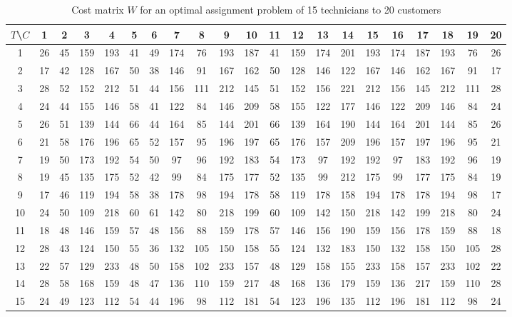 \begin{enumerate}[(a)]
\begin{enumerate}[1.]
\begin{table}[H]
	\centering
	\caption{Cost matrix $W$ for an optimal assignment problem of 15 technicians to 20 customers}
	\begin{tabular}{|*{21}{c|}}\hline
 $T$\textbackslash $C$ & 1 & 2 & 3 & 4 & 5 & 6 & 7 & 8 & 9 & 10 & 11 & 12 & 13 & 14 & 15 & 16 & 17 & 18 & 19 & 20\\\hline
1 & 26  & 45  & 159  & 193  & 41  & 49  & 174  & 76  & 193  & 187  & 41  & 159  & 174  & 201  & 193  & 174  & 187  & 193  & 76  & 26 \\ \hline
2 & 17  & 42  & 128  & 167  & 50  & 38  & 146  & 91  & 167  & 162  & 50  & 128  & 146  & 122  & 167  & 146  & 162  & 167  & 91  & 17 \\ \hline
3 & 28  & 52  & 152  & 212  & 51  & 44  & 156  & 111  & 212  & 145  & 51  & 152  & 156  & 221  & 212  & 156  & 145  & 212  & 111  & 28 \\ \hline
4 & 24  & 44  & 155  & 146  & 58  & 41  & 122  & 84  & 146  & 209  & 58  & 155  & 122  & 177  & 146  & 122  & 209  & 146  & 84  & 24 \\ \hline
5 & 26  & 51  & 139  & 144  & 66  & 44  & 164  & 85  & 144  & 201  & 66  & 139  & 164  & 190  & 144  & 164  & 201  & 144  & 85  & 26 \\ \hline
6 & 21  & 58  & 176  & 196  & 65  & 52  & 157  & 95  & 196  & 197  & 65  & 176  & 157  & 209  & 196  & 157  & 197  & 196  & 95  & 21 \\ \hline
7 & 19  & 50  & 173  & 192  & 54  & 50  & 97  & 96  & 192  & 183  & 54  & 173  & 97  & 192  & 192  & 97  & 183  & 192  & 96  & 19 \\ \hline
8 & 19  & 45  & 135  & 175  & 52  & 42  & 99  & 84  & 175  & 177  & 52  & 135  & 99  & 212  & 175  & 99  & 177  & 175  & 84  & 19 \\ \hline
9 & 17  & 46  & 119  & 194  & 58  & 38  & 178  & 98  & 194  & 178  & 58  & 119  & 178  & 158  & 194  & 178  & 178  & 194  & 98  & 17 \\ \hline
10 & 24  & 50  & 109  & 218  & 60  & 61  & 142  & 80  & 218  & 199  & 60  & 109  & 142  & 150  & 218  & 142  & 199  & 218  & 80  & 24 \\ \hline
11 & 18  & 48  & 146  & 159  & 57  & 48  & 156  & 88  & 159  & 178  & 57  & 146  & 156  & 190  & 159  & 156  & 178  & 159  & 88  & 18 \\ \hline
12 & 28  & 43  & 124  & 150  & 55  & 36  & 132  & 105  & 150  & 158  & 55  & 124  & 132  & 183  & 150  & 132  & 158  & 150  & 105  & 28 \\ \hline
13 & 22  & 57  & 129  & 233  & 48  & 50  & 158  & 102  & 233  & 157  & 48  & 129  & 158  & 155  & 233  & 158  & 157  & 233  & 102  & 22 \\ \hline
14 & 28  & 58  & 168  & 159  & 48  & 47  & 136  & 110  & 159  & 217  & 48  & 168  & 136  & 179  & 159  & 136  & 217  & 159  & 110  & 28 \\ \hline
15 & 24  & 49  & 123  & 112  & 54  & 44  & 196  & 98  & 112  & 181  & 54  & 123  & 196  & 135  & 112  & 196  & 181  & 112  & 98  & 24 \\ \hline
	\end{tabular}
	\label{graph-1-b}
\end{table}
	

\end{enumerate}
\end{enumerate}
